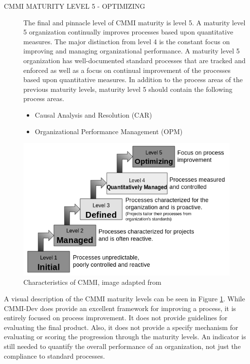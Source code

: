 \documentclass[SDSUThesis.tex]{subfiles}
\begin{document}
\begin{description}
        \item[CMMI MATURITY LEVEL 5 - OPTIMIZING]
            The final and pinnacle level of CMMI maturity is level 5.  
            A maturity level 5 organization
            continually improves processes based upon quantitative measures.  
            The major distinction from 
            level 4 is the constant focus on improving and managing 
            organizational performance.  A maturity level
            5 organization has well-documented standard processes that are 
            tracked and enforced as well as
            a focus on continual improvement of the processes based upon 
            quantitative measures.  In addition to the process areas of the 
            previous maturity levels, maturity
            level 5 should contain the following process areas.
            \begin{itemize}
                \item Causal Analysis and Resolution (CAR)
                \item Organizational Performance Management (OPM)
            \end{itemize}
    \end{description}

    \begin{figure}[ht]
        \centering
        \includegraphics[scale=.7]{images/cmmi.png}
        \caption[CHARACTERISTICS OF CMMI]{Characteristics of CMMI, 
            image adapted from  \cite{Godfrey} }
        \label{fig:cmmi}
    \end{figure}

    A visual description of the CMMI maturity levels can be seen in Figure \ref{fig:cmmi}.  
    While CMMI-Dev does provide an excellent framework for improving a process, it
    is entirely focused on process improvement.  It does not provide guidelines
    for evaluating the final product.  
    Also, it does not provide a specify mechanism for evaluating
    or scoring the progression through the maturity levels.  
    An indicator is still needed to quantify the overall 
    performance of an organization, not
    just the compliance to standard processes.  
\end{document}
